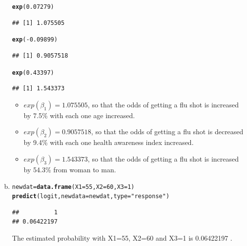 \documentclass{article}\usepackage[]{graphicx}\usepackage[]{color}
\makeatletter
\newcommand{\hlnum}[1]{\textcolor[rgb]{0.686,0.059,0.569}{#1}}%
\newcommand{\hlstr}[1]{\textcolor[rgb]{0.192,0.494,0.8}{#1}}%
\newcommand{\hlopt}[1]{\textcolor[rgb]{0,0,0}{#1}}%
\newcommand{\hlstd}[1]{\textcolor[rgb]{0.345,0.345,0.345}{#1}}%
\newcommand{\hlkwb}[1]{\textcolor[rgb]{0.69,0.353,0.396}{#1}}%
\newcommand{\hlkwc}[1]{\textcolor[rgb]{0.333,0.667,0.333}{#1}}%
\newcommand{\hlkwd}[1]{\textcolor[rgb]{0.737,0.353,0.396}{\textbf{#1}}}%
\newenvironment{kframe}{%
 \def\at@end@of@kframe{}%
 \ifinner\ifhmode%
  \def\at@end@of@kframe{\end{minipage}}%
  \begin{minipage}{\columnwidth}%
 \fi\fi%
 \def\FrameCommand##1{\hskip\@totalleftmargin \hskip-\fboxsep
 \colorbox{shadecolor}{##1}\hskip-\fboxsep
     \hskip-\linewidth \hskip-\@totalleftmargin \hskip\columnwidth}%
 \MakeFramed {\advance\hsize-\width
   \@totalleftmargin\z@ \linewidth\hsize
   \@setminipage}}%
 {\par\unskip\endMakeFramed%
 \at@end@of@kframe}
\newenvironment{knitrout}{}{} %
\makeatother
\begin{document}
\begin{enumerate}[(a)]
\begin{knitrout}
\color{fgcolor}\begin{kframe}
\begin{alltt}
  \hlkwd{exp}\hlstd{(}\hlnum{0.07279}\hlstd{)}
\end{alltt}
\begin{verbatim}
## [1] 1.075505
\end{verbatim}
\begin{alltt}
  \hlkwd{exp}\hlstd{(}\hlopt{-}\hlnum{0.09899} \hlstd{)}
\end{alltt}
\begin{verbatim}
## [1] 0.9057518
\end{verbatim}
\begin{alltt}
  \hlkwd{exp}\hlstd{(}\hlnum{0.43397}\hlstd{)}
\end{alltt}
\begin{verbatim}
## [1] 1.543373
\end{verbatim}
\end{kframe}
\end{knitrout}

\begin{itemize}
\item
$exp(\beta_1)=1.075505$, so that the odds of getting a flu shot is increased by 7.5\% with each one age increased.
\item
$exp(\beta_2)=0.9057518$, so that the odds of getting a flu shot is decreased by 9.4\% with each one health awareness index increased.
\item
$exp(\beta_3)=1.543373$, so that the odds of getting a flu shot is increased by 54.3\% from woman to man.
\end{itemize}

\item

\begin{knitrout}
\color{fgcolor}\begin{kframe}
\begin{alltt}
  \hlstd{newdat} \hlkwb{=} \hlkwd{data.frame}\hlstd{(}\hlkwc{X1} \hlstd{=} \hlnum{55}\hlstd{,} \hlkwc{X2} \hlstd{=} \hlnum{60}\hlstd{,} \hlkwc{X3} \hlstd{=} \hlnum{1}\hlstd{)}
  \hlkwd{predict}\hlstd{(logit,} \hlkwc{newdata} \hlstd{= newdat,} \hlkwc{type} \hlstd{=} \hlstr{"response"}\hlstd{)}
\end{alltt}
\begin{verbatim}
##          1 
## 0.06422197
\end{verbatim}
\end{kframe}
\end{knitrout}

\qquad The estimated probability with X1=55, X2=60 and X3=1 is 0.06422197 .

\end{enumerate}
\end{document}
